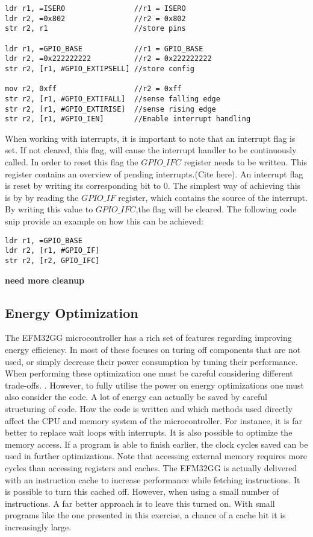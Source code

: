 \begin{lstlisting}
ldr r1, =ISER0                //r1 = ISERO
ldr r2, =0x802                //r2 = 0x802  
str r2, r1                    //store pins

ldr r1, =GPIO_BASE            //r1 = GPIO_BASE
ldr r2, =0x222222222          //r2 = 0x222222222
str r2, [r1, #GPIO_EXTIPSELL] //store config

mov r2, 0xff                  //r2 = 0xff 
str r2, [r1, #GPIO_EXTIFALL]  //sense falling edge
str r2, [r1, #GPIO_EXTIRISE]  //sense rising edge
str r2, [r1, #GPIO_IEN]       //Enable interrupt handling 

\end{lstlisting}

When working with interrupts, it is important to note that an interrupt flag is set. If not cleared, this flag, will cause the interrupt handler to be continuously called. In order to reset this flag the $GPIO\_IFC$ register needs to be written. This register contains an overview of pending interrupts.(Cite here). An interrupt flag is reset by writing its corresponding bit to 0.  The simplest way of achieving this is by by reading the $GPIO\_IF$ register, which contains the source of the interrupt. By writing this value to $GPIO\_IFC$,the flag will be cleared. The following code snip provide an example on how this can be achieved:

\begin{lstlisting}
ldr r1, =GPIO_BASE
ldr r2, [r1, #GPIO_IF]
str r2, [r2, GPIO_IFC]
\end{lstlisting}
 
{\bf need more cleanup}


\subsection{Energy Optimization}\label{ch:energy_optimization} 
The EFM32GG microcontroller has a rich set of features regarding improving energy efficiency. In most of these focuses on turing off components that are not used, or simply decrease their power consumption by tuning their performance. When performing these optimization one must be careful considering different trade-offs. \cite{EFM32GG-energy}. However, to fully utilise the power on energy optimizations one must also consider the code. A lot of energy can actually be saved by careful structuring of code. How the code is written and which methods used directly affect the CPU and memory system of the microcontroller. For instance, it is far better to replace wait loops with interrupts. It is also possible to optimize the memory access. If a program is able to finish earlier, the clock cycles saved can be used in further optimizations. Note that accessing external memory requires more cycles than accessing registers and caches. The EFM32GG is actually delivered with an instruction cache to increase performance while fetching instructions. It is possible to turn this cached off. However, when using a small number of instructions. A far better approach is to leave this turned on. With small programs like the one presented in this exercise, a chance of a cache hit it is increasingly large. 

